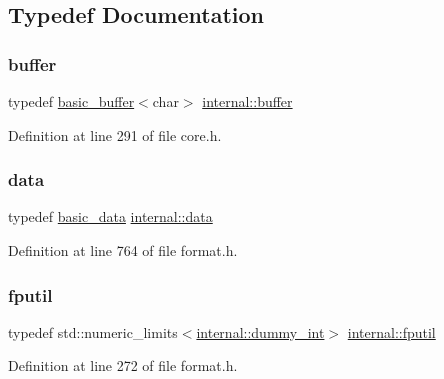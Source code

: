 

\subsection{Typedef Documentation}
\mbox{\label{namespaceinternal_a5fcdbc3efad1f390e6c3f0fdafa56122}} 
\subsubsection{\texorpdfstring{buffer}{buffer}}
{\footnotesize\ttfamily typedef \hyperlink{classinternal_1_1basic__buffer}{basic\+\_\+buffer}$<$char$>$ \hyperlink{namespaceinternal_a5fcdbc3efad1f390e6c3f0fdafa56122}{internal\+::buffer}}



Definition at line 291 of file core.\+h.

\mbox{\label{namespaceinternal_adc3036f1841136e36e29e5fd339de1a1}} 
\subsubsection{\texorpdfstring{data}{data}}
{\footnotesize\ttfamily typedef \hyperlink{structinternal_1_1basic__data}{basic\+\_\+data} \hyperlink{namespaceinternal_adc3036f1841136e36e29e5fd339de1a1}{internal\+::data}}



Definition at line 764 of file format.\+h.

\mbox{\label{namespaceinternal_aa7d06ba7f624d16317103f85ae364c7f}} 
\subsubsection{\texorpdfstring{fputil}{fputil}}
{\footnotesize\ttfamily typedef std\+::numeric\+\_\+limits$<$\hyperlink{structinternal_1_1dummy__int}{internal\+::dummy\+\_\+int}$>$ \hyperlink{namespaceinternal_aa7d06ba7f624d16317103f85ae364c7f}{internal\+::fputil}}



Definition at line 272 of file format.\+h.

\mbox{\label{namespaceinternal_a934b7952794e1164012436fcd82abb6b}} 
